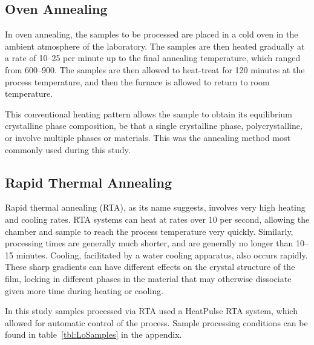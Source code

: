 
\subsection{Oven Annealing}

In oven annealing, the samples to be processed are placed in a cold oven in the ambient atmosphere of the laboratory. The samples are then heated gradually at a rate of 10--25\degC{} per minute up to the final annealing temperature, which ranged from 600--900\degC{}. The samples are then allowed to heat-treat for 120 minutes at the process temperature, and then the furnace is allowed to return to room temperature. 

This conventional heating pattern allows the sample to obtain its equilibrium crystalline phase composition, be that a single crystalline phase, polycrystalline, or involve multiple phases or materials. This was the annealing method most commonly used during this study. 


\subsection{Rapid Thermal Annealing}

Rapid thermal annealing (RTA), as its name suggests, involves very high heating and cooling rates. RTA systems can heat at rates over 10\degC{} per second, allowing the chamber and sample to reach the process temperature very quickly. Similarly, processing times are generally much shorter, and are generally no longer than 10--15 minutes. Cooling, facilitated by a water cooling apparatus, also occurs rapidly. These sharp gradients can have different effects on the crystal structure of the film, locking in different phases in the material that may otherwise dissociate given more time during heating or cooling. 

In this study samples processed via RTA used a HeatPulse\textsuperscript{\texttrademark} RTA system, which allowed for automatic control of the process. Sample processing conditions can be found in table~\vref{tbl:LoSamples} in the appendix. 





